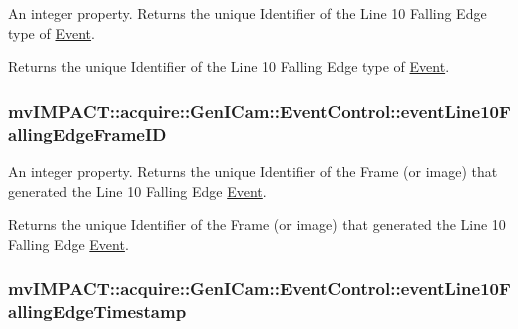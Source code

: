 An integer property. Returns the unique Identifier of the Line 10 Falling Edge type of \hyperlink{classmv_i_m_p_a_c_t_1_1acquire_1_1_event}{Event}. 

Returns the unique Identifier of the Line 10 Falling Edge type of \hyperlink{classmv_i_m_p_a_c_t_1_1acquire_1_1_event}{Event}. \hypertarget{classmv_i_m_p_a_c_t_1_1acquire_1_1_gen_i_cam_1_1_event_control_abd7e167c95d7038b7a163c460e592e5c}{
\subsubsection[{event\+Line10\+Falling\+Edge\+Frame\+I\+D}]{ mv\+I\+M\+P\+A\+C\+T\+::acquire\+::\+Gen\+I\+Cam\+::\+Event\+Control\+::event\+Line10\+Falling\+Edge\+Frame\+I\+D}}\label{classmv_i_m_p_a_c_t_1_1acquire_1_1_gen_i_cam_1_1_event_control_abd7e167c95d7038b7a163c460e592e5c}


An integer property. Returns the unique Identifier of the Frame (or image) that generated the Line 10 Falling Edge \hyperlink{classmv_i_m_p_a_c_t_1_1acquire_1_1_event}{Event}. 

Returns the unique Identifier of the Frame (or image) that generated the Line 10 Falling Edge \hyperlink{classmv_i_m_p_a_c_t_1_1acquire_1_1_event}{Event}. \hypertarget{classmv_i_m_p_a_c_t_1_1acquire_1_1_gen_i_cam_1_1_event_control_ac6da83280ffe3677cb1620a6e5c26691}{
\subsubsection[{event\+Line10\+Falling\+Edge\+Timestamp}]{ mv\+I\+M\+P\+A\+C\+T\+::acquire\+::\+Gen\+I\+Cam\+::\+Event\+Control\+::event\+Line10\+Falling\+Edge\+Timestamp}}\label{classmv_i_m_p_a_c_t_1_1acquire_1_1_gen_i_cam_1_1_event_control_ac6da83280ffe3677cb1620a6e5c26691}


